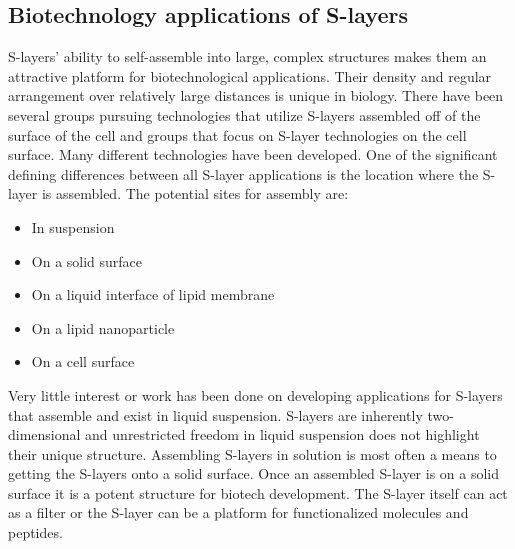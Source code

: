  \subsection{Biotechnology applications of S-layers}\label{sec:biot-appl-s}
  
  \Acp{S-layer}' ability to self-assemble into large, complex structures makes them an attractive platform for biotechnological applications. Their density and regular arrangement
over relatively large distances is unique in biology. There have been several groups pursuing technologies that utilize \acp{S-layer} assembled off of the surface of the cell and
groups that focus on \ac{S-layer} technologies on the cell surface. Many different technologies have been developed. One of the significant defining differences between all
\ac{S-layer} applications is the location where the \ac{S-layer} is assembled. The potential sites for assembly are:
  \begin{itemize}
  \item In suspension
  \item On a solid surface
  \item On a liquid interface of lipid membrane
  \item On a lipid nanoparticle
  \item On a cell surface
  \end{itemize} %

  Very little interest or work has been done on developing applications for \acp{S-layer} that assemble and exist in liquid suspension. \Acp{S-layer} are inherently two-dimensional
and unrestricted freedom in liquid suspension does not highlight their unique structure. Assembling \acp{S-layer} in solution is most often a means to getting the \acp{S-layer}
onto a solid surface. Once an assembled \ac{S-layer} is on a solid surface it is a potent structure for biotech development. The \ac{S-layer} itself can act as a filter or the
\ac{S-layer} can be a platform for functionalized molecules and peptides.

